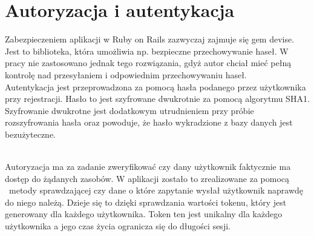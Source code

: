 \section{Autoryzacja i autentykacja}
\label{sec:autoryzacjaAutentykacja}
Zabezpieczeniem aplikacji w Ruby on Rails zazwyczaj zajmuje się gem devise. Jest to biblioteka, która umożliwia np. bezpieczne przechowywanie haseł\cite{rails}. W pracy nie zastosowano jednak tego rozwiązania, gdyż autor chciał mieć pełną  kontrolę nad przesyłaniem i odpowiednim przechowywaniu haseł.\\
Autentykacja jest przeprowadzona za pomocą hasła podanego przez użytkownika przy rejestracji. Hasło to jest szyfrowane dwukrotnie za pomocą algorytmu SHA1. Szyfrowanie dwukrotne jest dodatkowym utrudnieniem przy próbie rozszyfrowania hasła oraz powoduje, że hasło wykradzione z bazy danych jest bezużyteczne.\\
\begin{minipage}{\linewidth}
\label{encryptpassword}
\end{minipage}\\
Autoryzacja ma za zadanie zweryfikować czy dany użytkownik faktycznie ma dostęp do żądanych zasobów. W aplikacji zostało to zrealizowane za pomocą  metody sprawdzającej czy dane o które zapytanie wysłał użytkownik naprawdę do niego należą. Dzieje się to dzięki sprawdzania wartości tokenu, który jest generowany dla każdego użytkownika. Token ten jest unikalny dla każdego użytkownika a jego czas życia ogranicza się do długości sesji. 
\begin{minipage}{\linewidth}
\label{authorization}
\end{minipage}\\
